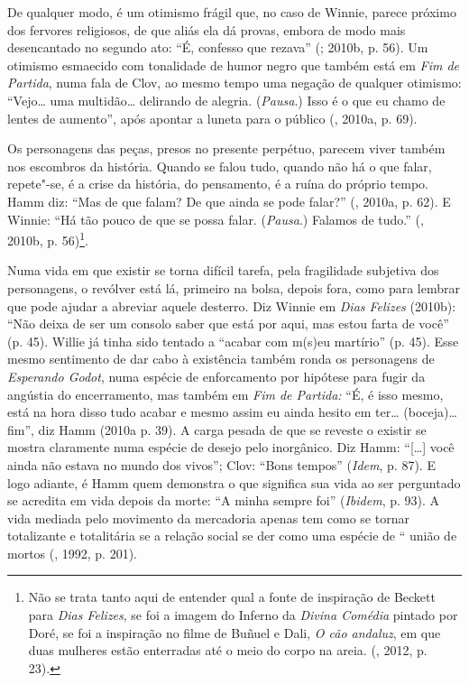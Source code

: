 De qualquer modo, é um otimismo frágil que, no caso de Winnie, parece
próximo dos fervores religiosos, de que aliás ela dá provas, embora de
modo mais desencantado no segundo ato: ``É, confesso que rezava''
(; 2010b, p. 56). Um otimismo esmaecido com tonalidade de humor
negro que também está em \emph{Fim de Partida}, numa fala de Clov, ao
mesmo tempo uma negação de qualquer otimismo: ``Vejo\ldots{} uma multidão\ldots{}
delirando de alegria. (\emph{Pausa}.) Isso é o que eu chamo de lentes de
aumento'', após apontar a luneta para o público (, 2010a, p. 69).

Os personagens das peças, presos no presente perpétuo, parecem viver
também nos escombros da história. Quando se falou tudo, quando não há o
que falar, repete"-se, é a crise da história, do pensamento, é a ruína do
próprio tempo. Hamm diz: ``Mas de que falam? De que ainda se pode
falar?'' (, 2010a, p. 62). E Winnie: ``Há tão pouco de que se
possa falar. (\emph{Pausa}.) Falamos de tudo.'' (, 2010b, p.
56)\footnote{Não se trata tanto aqui de entender qual a fonte de
  inspiração de Beckett para \emph{Dias Felizes}, se foi a imagem
  do Inferno da \emph{Divina Comédia} pintado por Doré, se foi a
  inspiração no filme de Buñuel e Dali, \emph{O cão andaluz}, em que
  duas mulheres estão enterradas até o meio do corpo na areia.
  (, 2012, p. 23).}.

Numa vida em que existir se torna difícil tarefa, pela fragilidade
subjetiva dos personagens, o revólver está lá, primeiro na bolsa, depois
fora, como para lembrar que pode ajudar a abreviar aquele desterro. Diz
Winnie em \emph{Dias Felizes} (2010b): ``Não deixa de ser um consolo
saber que está por aqui, mas estou farta de você'' (p. 45). Willie já
tinha sido tentado a ``acabar com m(s)eu martírio'' (p. 45). Esse mesmo
sentimento de dar cabo à existência também ronda os personagens de
\emph{Esperando Godot}, numa espécie de enforcamento por hipótese para
fugir da angústia do encerramento, mas também em \emph{Fim de Partida:}
``É, é isso mesmo, está na hora disso tudo acabar e mesmo assim eu ainda
hesito em ter\ldots{} (boceja)\ldots{} fim'', diz Hamm (2010a p. 39). A carga
pesada de que se reveste o existir se mostra claramente numa espécie de
desejo pelo inorgânico. Diz Hamm: ``[\ldots{}] você ainda não estava no
mundo dos vivos''; Clov: ``Bons tempos'' (\emph{Idem}, p. 87). E logo
adiante, é Hamm quem demonstra o que significa sua vida ao ser
perguntado se acredita em vida depois da morte: ``A minha sempre foi''
(\emph{Ibidem}, p. 93). A vida mediada pelo movimento da mercadoria
apenas tem como se tornar totalizante e totalitária se a relação social
se der como uma espécie de `` união de mortos (, 1992, p. 201).

